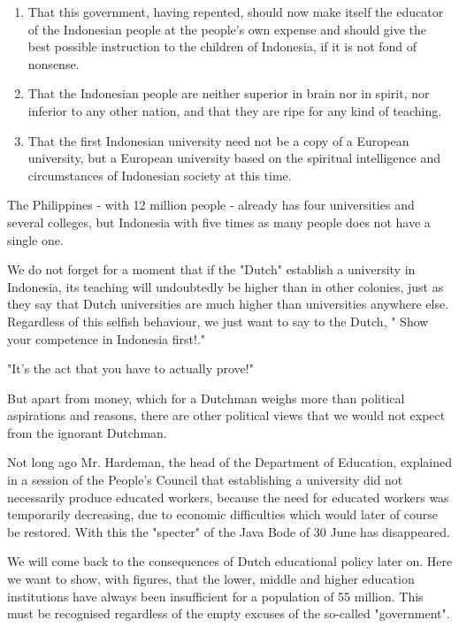 \begin{enumerate}
    \item That this government, having repented, should now make itself the educator of the Indonesian people at the people's own expense and should give the best possible instruction to the children of Indonesia, if it is not fond of nonsense.
    \item That the Indonesian people are neither superior in brain nor in spirit, nor inferior to any other nation, and that they are ripe for any kind of teaching.
    \item That the first Indonesian university need not be a copy of a European university, but a European university based on the spiritual intelligence and circumstances of Indonesian society at this time.
\end{enumerate}

The Philippines - with 12 million people - already has four universities and several colleges, 
but Indonesia with five times as many people does not have a single one.\nline

We do not forget for a moment that if the "Dutch" establish a university in 
Indonesia, its teaching will undoubtedly be higher than in other colonies, 
just as they say that Dutch universities are much higher than universities 
anywhere else. Regardless of this selfish behaviour, we just want to say to the Dutch, " Show your competence in Indonesia first!."\nline

"It's the act that you have to actually prove!"

But apart from money, which for a Dutchman weighs more than political aspirations and reasons, 
there are other political views that we would not expect from the ignorant Dutchman.\nline

Not long ago Mr. Hardeman, the head of the Department of Education, explained in a session 
of the People's Council that establishing a university did not necessarily produce educated 
workers, because the need for educated workers was temporarily decreasing, due to economic 
difficulties which would later of course be restored. With this the "specter" of the Java Bode of 30 June has disappeared.\nline

We will come back to the consequences of Dutch educational policy later on. Here we want to 
show, with figures, that the lower, middle and higher education institutions have always 
been insufficient for a population of 55 million. This must be recognised regardless of 
the empty excuses of the so-called "government".\nline

